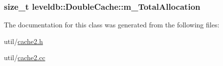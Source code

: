 \subsubsection[{m\+\_\+\+Total\+Allocation}]{\setlength{\rightskip}{0pt plus 5cm}size\+\_\+t leveldb\+::\+Double\+Cache\+::m\+\_\+\+Total\+Allocation\hspace{0.3cm}{\ttfamily [protected]}}\label{classleveldb_1_1_double_cache_a1e37f45144f9a47321def85cd7ceca0b}


The documentation for this class was generated from the following files\+:\begin{DoxyCompactItemize}
\item 
util/\hyperlink{cache2_8h}{cache2.\+h}\item 
util/\hyperlink{cache2_8cc}{cache2.\+cc}\end{DoxyCompactItemize}

